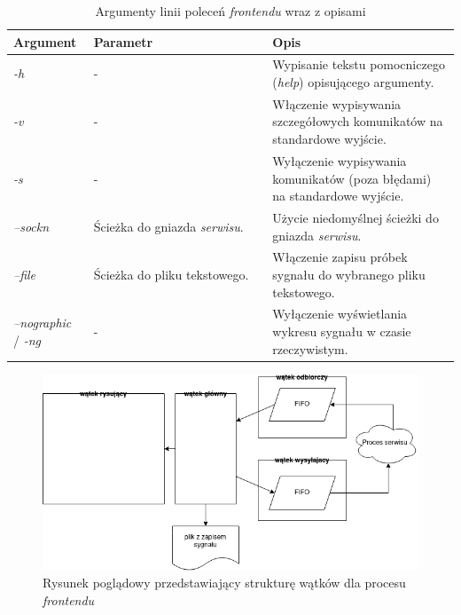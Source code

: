 \begin{table}[h!]
\centering
    \caption{Argumenty linii poleceń \textit{frontendu} wraz z opisami}
\label{tab:frontend-cmd-args}
    \begin{tabular}{|p{0.18\linewidth}|p{0.4\linewidth}|p{0.42\linewidth}|}
\hline
    \textbf{Argument} & \textbf{Parametr} & \textbf{Opis}        \\ \hline
    \textit{-h} & - & Wypisanie tekstu pomocniczego (\textit{help}) opisującego argumenty.\\ \hline
    \textit{-v} & - & Włączenie wypisywania szczegółowych komunikatów na standardowe wyjście.   \\ \hline
    \textit{-s} & - & Wyłączenie wypisywania komunikatów (poza błędami) na standardowe wyjście. \\ \hline
    \textit{--sockn} & Ścieżka do gniazda \textit{serwisu}. & Użycie niedomyślnej ścieżki do gniazda \textit{serwisu}. \\ \hline
    \textit{--file} & Ścieżka do pliku tekstowego. & Włączenie zapisu próbek sygnału do wybranego pliku tekstowego. \\ \hline
    \textit{--nographic} / \textit{-ng} & - & Wyłączenie wyświetlania wykresu sygnału w czasie rzeczywistym. \\ \hline
\end{tabular}
\end{table}

\newpage

\begin{figure}[h!]
    \centering 
    \includegraphics[scale=0.5]{pl/media/app_ipc.png}
    \caption{Rysunek poglądowy przedstawiający strukturę wątków dla procesu \textit{frontendu}}
    \label{fig:app_ipc}
\end{figure}

